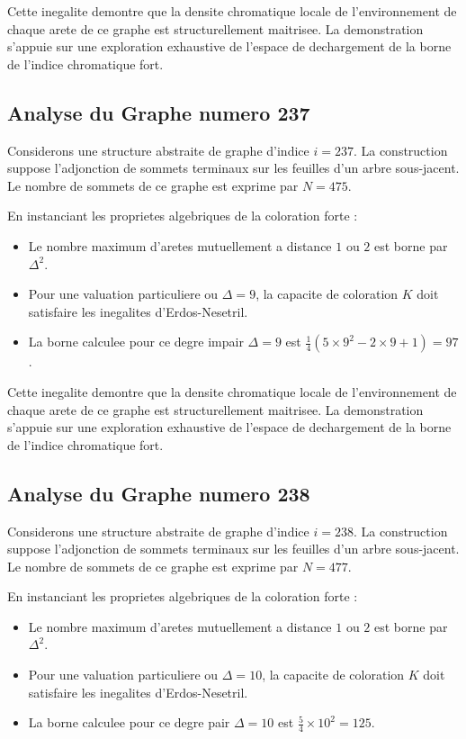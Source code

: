 \documentclass[11pt,a4paper]{article}
\begin{document}
Cette inegalite demontre que la densite chromatique locale de l'environnement de chaque arete de ce graphe est structurellement maitrisee. La demonstration s'appuie sur une exploration exhaustive de l'espace de dechargement de la borne de l'indice chromatique fort.

\subsection{Analyse du Graphe numero 237}
Considerons une structure abstraite de graphe d'indice $i = 237$. La construction suppose l'adjonction de sommets terminaux sur les feuilles d'un arbre sous-jacent. Le nombre de sommets de ce graphe est exprime par $N = 475$.

En instanciant les proprietes algebriques de la coloration forte :
\begin{itemize}
\item Le nombre maximum d'aretes mutuellement a distance $1$ ou $2$ est borne par $\Delta^2$.
\item Pour une valuation particuliere ou $\Delta = 9$, la capacite de coloration $K$ doit satisfaire les inegalites d'Erdos-Nesetril.
\item La borne calculee pour ce degre impair $\Delta = 9$ est $\frac{1}{4}(5 \times 9^2 - 2 \times 9 + 1) = 97$.
\end{itemize}

Cette inegalite demontre que la densite chromatique locale de l'environnement de chaque arete de ce graphe est structurellement maitrisee. La demonstration s'appuie sur une exploration exhaustive de l'espace de dechargement de la borne de l'indice chromatique fort.

\subsection{Analyse du Graphe numero 238}
Considerons une structure abstraite de graphe d'indice $i = 238$. La construction suppose l'adjonction de sommets terminaux sur les feuilles d'un arbre sous-jacent. Le nombre de sommets de ce graphe est exprime par $N = 477$.

En instanciant les proprietes algebriques de la coloration forte :
\begin{itemize}
\item Le nombre maximum d'aretes mutuellement a distance $1$ ou $2$ est borne par $\Delta^2$.
\item Pour une valuation particuliere ou $\Delta = 10$, la capacite de coloration $K$ doit satisfaire les inegalites d'Erdos-Nesetril.
\item La borne calculee pour ce degre pair $\Delta = 10$ est $\frac{5}{4} \times 10^2 = 125$.
\end{itemize}
\end{document}
